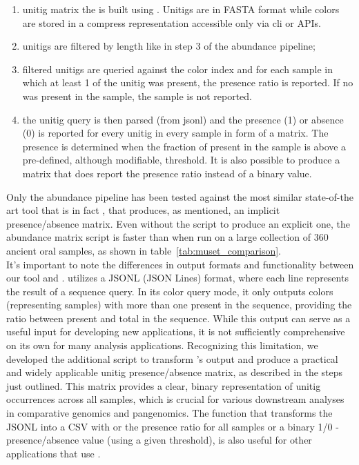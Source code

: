 \begin{enumerate}
	\item unitig matrix the \ccdbg is built using \ggcat. Unitigs are in FASTA format while colors are stored in a compress representation accessible only via \ggcat \gls{cli} or \gls{API}s.
	\item unitigs are filtered by length like in step 3 of the abundance pipeline;
	\item filtered unitigs are queried against the \ggcat color index and for each sample in which at least 1 \kmer of the unitig was present, the presence ratio is reported. If no \kmer was present in the sample, the sample is not reported.
	\item the unitig query is then parsed (from jsonl) and the presence (1) or absence (0) is reported for every unitig in every sample in form of a matrix. The presence is determined when the fraction of present \kmers in the sample is above a pre-defined, although modifiable, threshold. It is also possible to produce a matrix that does report the presence ratio instead of a binary value.
\end{enumerate}
Only the abundance pipeline has been tested against the most similar state-of-the art tool that is in fact \ggcat, that produces, as mentioned, an implicit presence/absence matrix. Even without the \muset script to produce an explicit one, the abundance matrix script is faster than \ggcat when run on a large collection of 360 ancient oral samples, as shown in table~\ref{tab:muset_comparison}.\\
It's important to note the differences in output formats and functionality between our tool and \ggcat. \ggcat utilizes a JSONL (JSON Lines) format, where each line represents the result of a sequence query. In its color query mode, it only outputs colors (representing samples) with more than one \kmer present in the sequence, providing the ratio between present \kmers and total \kmers in the sequence. While this output can serve as a useful input for developing new applications, it is not sufficiently comprehensive on its own for many analysis applications. Recognizing this limitation, we developed the additional \muset script to transform \ggcat's output and produce a practical and widely applicable unitig presence/absence matrix, as described in the steps just outlined. This matrix provides a clear, binary representation of unitig occurrences across all samples, which is crucial for various downstream analyses in comparative genomics and pangenomics. The \kmat function that transforms the JSONL into a CSV with or the presence ratio for all samples or a binary 1/0 - presence/absence value (using a given threshold), is also useful for other applications that use \ggcat.
